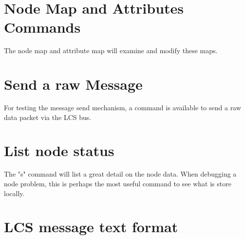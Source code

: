 
\section{Node Map and Attributes Commands}

The node map and attribute map will examine and modify these maps.


\section{Send a raw Message}

For testing the message send mechanism, a command is available to send a raw data packet via the LCS bus.


\section{List node status}

The "s" command will list a great detail on the node data. When debugging a node problem, this is perhaps the most useful command to see what is store locally.



\section{LCS message text format}

